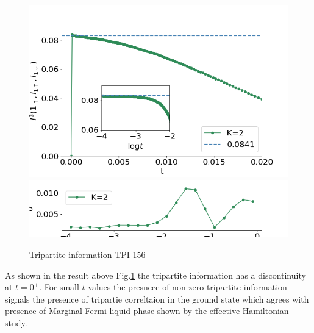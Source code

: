 \documentclass[reprint,prb,superscriptaddress]{revtex4-2}
\begin{document}
\begin{figure}
\includegraphics[scale=0.4]{plt/A_I3_ch2_[1,5,6]}
\includegraphics[scale=0.4]{plt/errorbar_A_I3_ch2_[1,5,6]}
\caption{Tripartite information TPI 156}
\label{fig:TPI_1_5_6}
\end{figure}
As shown in the result above Fig.\ref{fig:TPI_1_5_6} the tripartite information has a discontinuity at $t=0^+$. For small $t$ values the presnece of non-zero tripartite information signals the presence of tripartie correltaion in the ground state which agrees with presence of Marginal Fermi liquid phase shown by the effective Hamiltonian study.
\end{document}
